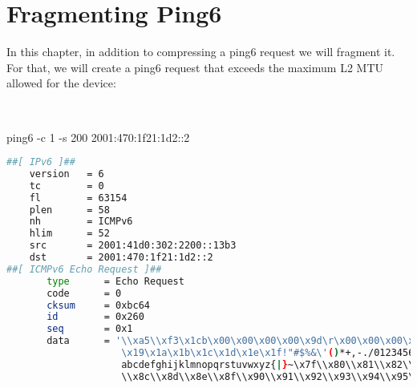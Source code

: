 


\chapter{Fragmenting Ping6}

In this chapter, in addition to compressing a ping6 request we will fragment it.
For that, we will create a ping6 request that exceeds the maximum L2 MTU allowed for the device:

~

\begin{termc}[backgroundcolor=\color{gray!10}, basicstyle=\ttfamily\small, escapechar=@]
ping6 -c 1 -s 200 2001:470:1f21:1d2::2
\end{termc}

\begin{lstlisting}[language=bash, basicstyle=\ttfamily\tiny, showstringspaces=false]
##[ IPv6 ]##
    version   = 6
    tc        = 0
    fl        = 63154
    plen      = 58
    nh        = ICMPv6
    hlim      = 52
    src       = 2001:41d0:302:2200::13b3
    dst       = 2001:470:1f21:1d2::2
##[ ICMPv6 Echo Request ]##
       type      = Echo Request
       code      = 0
       cksum     = 0xbc64
       id        = 0x260
       seq       = 0x1
       data      = '\\xa5\\xf3\x1cb\x00\x00\x00\x00\x9d\r\x00\x00\x00\x00\x00\x10\x1 1\x12\x13\x14\x15\x16\x17\x18
                    \x19\x1a\x1b\x1c\x1d\x1e\x1f!"#$%&\'()*+,-./0123456789:;<=>?@ABCDEFGHIJKLMNOPQRSTUVWXYZ[\\]^_`
                    abcdefghijklmnopqrstuvwxyz{|}~\x7f\\x80\\x81\\x82\\x83\\x84\\x85\\x86\\x87\\x88\\x89\\x8a\\x8b
                    \\x8c\\x8d\\x8e\\x8f\\x90\\x91\\x92\\x93\\x94\\x95\\x96\\x97\\x98\\x99\\x9a\\x9b\\x9c\\x9d\\x9e

\end{lstlisting}
